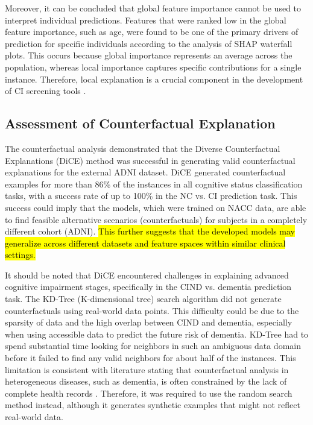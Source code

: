 Moreover, it can be concluded that global feature importance cannot be used to interpret individual predictions. Features that were ranked low in the global feature importance, such as age, were found to be one of the primary drivers of prediction for specific individuals according to the analysis of SHAP waterfall plots. This occurs because global importance represents an average across the population, whereas local importance captures specific contributions for a single instance. Therefore, local explanation is a crucial component in the development of CI screening tools \cite{Hakkoum2024Global}.

\subsection{Assessment of Counterfactual Explanation}
The counterfactual analysis demonstrated that the Diverse Counterfactual Explanations (\acrshort{DiCE}) method was successful in generating valid counterfactual explanations for the external ADNI dataset. DiCE generated counterfactual examples for more than 86\% of the instances in all cognitive status classification tasks, with a success rate of up to 100\% in the NC vs. CI prediction task. This success could imply that the models, which were trained on NACC data, are able to find feasible alternative scenarios (counterfactuals) for subjects in a completely different cohort (\acrshort{ADNI}). \hl{This further suggests that the developed models may generalize across different datasets and feature spaces within similar clinical settings.}

It should be noted that DiCE encountered challenges in explaining advanced cognitive impairment stages, specifically in the CIND vs. dementia prediction task. The \acrshort{KD-Tree} (K-dimensional tree) search algorithm did not generate counterfactuals using real-world data points. This difficulty could be due to the sparsity of data and the high overlap between CIND and dementia, especially when using accessible data to predict the future risk of dementia. KD-Tree had to spend substantial time looking for neighbors in such an ambiguous data domain before it failed to find any valid neighbors for about half of the instances. This limitation is consistent with literature stating that counterfactual analysis in heterogeneous diseases, such as dementia, is often constrained by the lack of complete health records \cite{Kim2022Counterfactual}. Therefore, it was required to use the random search method instead, although it generates synthetic examples that might not reflect real-world data. 

